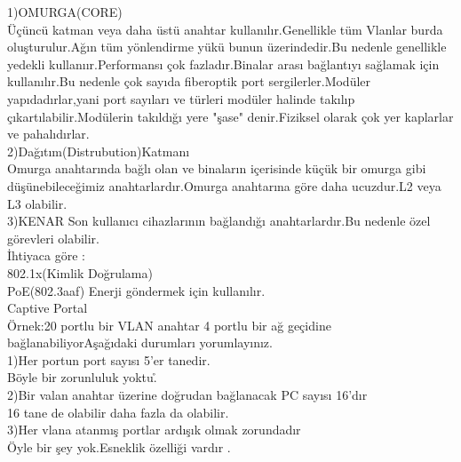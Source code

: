 1)OMURGA(CORE)\\
Üçüncü katman veya daha üstü anahtar kullanılır.Genellikle tüm Vlanlar burda oluşturulur.Ağın tüm yönlendirme yükü bunun üzerindedir.Bu nedenle genellikle yedekli kullanıır.Performansı çok fazladır.Binalar arası bağlantıyı sağlamak için kullanılır.Bu nedenle çok sayıda fiberoptik port sergilerler.Modüler yapıdadırlar,yani port sayıları ve türleri modüler halinde takılıp çıkartılabilir.Modülerin takıldığı yere "şase" denir.Fiziksel olarak çok yer kaplarlar ve pahalıdırlar.\\
2)Dağıtım(Distrubution)Katmanı \\
Omurga anahtarında bağlı olan ve binaların içerisinde küçük bir omurga gibi düşünebileceğimiz anahtarlardır.Omurga anahtarına göre daha ucuzdur.L2 veya L3 olabilir.\\
3)KENAR
Son kullanıcı cihazlarının bağlandığı anahtarlardır.Bu nedenle özel görevleri olabilir.\\
İhtiyaca göre :\\
802.1x(Kimlik Doğrulama)\\
PoE(802.3aaf) Enerji göndermek için kullanılır.\\
Captive Portal\\
Örnek:20 portlu bir VLAN anahtar 4  portlu bir ağ geçidine bağlanabiliyorAşağıdaki durumları yorumlayınız.\\
1)Her portun port sayısı 5'er tanedir.\\
Böyle bir zorunluluk yoktu\r.\\
2)Bir valan anahtar üzerine doğrudan bağlanacak PC sayısı 16'dır\\
16 tane de olabilir daha fazla da olabilir.\\
3)Her vlana atanmış portlar ardışık olmak zorundadır\\
Öyle bir şey yok.Esneklik özelliği vardır . 
